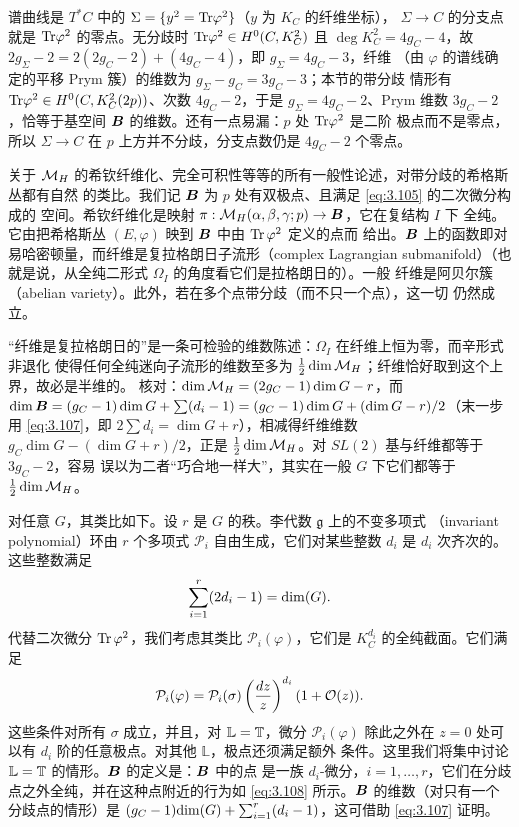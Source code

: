 \begin{yizhu}[含糊点拨]
谱曲线是 $T^*C$ 中的 $\Sigma=\{y^2={\rm Tr}\varphi^2\}$（$y$ 为 $K_C$ 的纤维坐标），
$\Sigma\to C$ 的分支点就是 ${\rm Tr}\varphi^2$ 的零点。无分歧时 ${\rm Tr}\varphi^2\in H^0(C,K_C^2)$
且 $\deg K_C^2=4g_C-4$，故 $2g_\Sigma-2=2(2g_C-2)+(4g_C-4)$，即 $g_\Sigma=4g_C-3$，纤维
（由 $\varphi$ 的谱线确定的平移 Prym 簇）的维数为 $g_\Sigma-g_C=3g_C-3$；本节的带分歧
情形有 ${\rm Tr}\varphi^2\in H^0(C,K_C^2(2p))$、次数 $4g_C-2$，于是 $g_\Sigma=4g_C-2$、Prym
维数 $3g_C-2$，恰等于基空间 $\bm{B}$ 的维数。还有一点易漏：$p$ 处 ${\rm Tr}\varphi^2$ 是二阶
极点而不是零点，所以 $\Sigma\to C$ 在 $p$ 上方并不分歧，分支点数仍是 $4g_C-2$ 个零点。
\end{yizhu}

关于 ${{\mathcal{M}}_H}$ 的希钦纤维化、完全可积性等等的所有一般性论述，对带分歧的希格斯丛都有自然
的类比。我们记 $\bm{B}$ 为 $p$ 处有双极点、且满足 \eqref{eq:3.105} 的二次微分构成的
空间。希钦纤维化是映射 $\pi:{{\mathcal{M}}_H}(\alpha,\beta,\gamma;p)\to\bm{B}$，它在复结构 $I$ 下
全纯。它由把希格斯丛 $(E,\varphi)$ 映到 $\bm{B}$ 中由 ${\rm Tr}\,\varphi^2$ 定义的点而
给出。$\bm{B}$ 上的函数即对易哈密顿量，而纤维是复拉格朗日子流形（complex Lagrangian
submanifold）（也就是说，从全纯二形式 $\Omega_I$ 的角度看它们是拉格朗日的）。一般
纤维是阿贝尔簇（abelian variety）。此外，若在多个点带分歧（而不只一个点），这一切
仍然成立。

\begin{yizhu}[易错点]
“纤维是复拉格朗日的”是一条可检验的维数陈述：$\Omega_I$ 在纤维上恒为零，而辛形式非退化
使得任何全纯迷向子流形的维数至多为 $\frac{1}{2}\dim{{\mathcal{M}}_H}$；纤维恰好取到这个上界，故必是半维的。
核对：$\dim{{\mathcal{M}}_H}=(2g_C-1)\dim G-r$，而
$\dim\bm{B}=(g_C-1)\dim G+\sum(d_i-1)=(g_C-1)\dim G+(\dim G-r)/2$（末一步用
\eqref{eq:3.107}，即 $2\sum d_i=\dim G+r$），相减得纤维维数
$g_C\dim G-(\dim G+r)/2$，正是 $\frac{1}{2}\dim{{\mathcal{M}}_H}$。对 $SL(2)$ 基与纤维都等于 $3g_C-2$，容易
误以为二者“巧合地一样大”，其实在一般 $G$ 下它们都等于 $\frac{1}{2}\dim{{\mathcal{M}}_H}$。
\end{yizhu}

对任意 $G$，其类比如下。设 $r$ 是 $G$ 的秩。李代数 $\mathfrak g$ 上的不变多项式
（invariant polynomial）环由 $r$ 个多项式 ${\mathcal P}_i$ 自由生成，它们对某些整数
$d_i$ 是 $d_i$ 次齐次的。这些整数满足
\setcounter{equation}{106}
\begin{equation}\label{eq:3.107}
  \sum_{i=1}^r(2d_i-1)={\rm dim}(G).
\end{equation}
代替二次微分 ${\rm Tr}\,\varphi^2$，我们考虑其类比 ${\mathcal P}_i(\varphi)$，它们是
$K_C^{d_i}$ 的全纯截面。它们满足
\setcounter{equation}{107}
\begin{equation}\label{eq:3.108}
  {\mathcal P}_i(\varphi)=
{\mathcal P}_i(\sigma)\left({dz\over z}\right)^{d_i}(1+{\mathcal O}(z)).
\end{equation}
这些条件对所有 $\sigma$ 成立，并且，对 $\mathbb{L}={\mathbb{T}}$，微分 ${\mathcal P}_i(\varphi)$
除此之外在 $z=0$ 处可以有 $d_i$ 阶的任意极点。对其他 $\mathbb{L}$，极点还须满足额外
条件。这里我们将集中讨论 $\mathbb{L}={\mathbb{T}}$ 的情形。$\bm{B}$ 的定义是：$\bm{B}$ 中的点
是一族 $d_i$-微分，$i=1,\dots, r$，它们在分歧点之外全纯，并在这种点附近的行为如
\eqref{eq:3.108} 所示。$\bm{B}$ 的维数（对只有一个分歧点的情形）是
$(g_C-1){\rm dim}(G)+\sum_{i=1}^r(d_i-1)$，这可借助 \eqref{eq:3.107} 证明。

